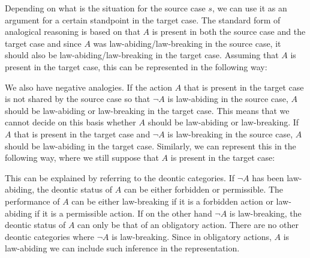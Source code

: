 		Depending on what is the situation for the source case $s$, we can use it as an argument for a certain standpoint in the target case. The standard form of analogical reasoning is based on that $A$ is present in both the source case and the target case and since $A$ was law-abiding/law-breaking in the source case, it should also be law-abiding/law-breaking in the target case. Assuming that $A$ is present in the target case, this can be represented in the following way: \medskip
			
			\noindent\begin{minipage}{0.9\textwidth}
			\end{minipage} \medskip	
			
		We also have negative analogies. If the action $A$ that is present in the target case is not shared by the source case so that $\neg A$ is law-abiding in the source case, $A$ should be law-abiding or law-breaking in the target case. This means that we cannot decide on this basis whether $A$ should be law-abiding or law-breaking. If $A$ that is present in the target case and $\neg A$ is law-breaking in the source case, $A$ should be law-abiding in the target case. Similarly, we can represent this in the following way, where we still suppose that $A$ is present in the target case:\medskip
			
			\noindent\begin{minipage}{0.9\textwidth}
			\end{minipage}\medskip

		This can be explained by referring to the deontic categories. If $\neg A$ has been law-abiding, the deontic status of $A$ can be either forbidden or permissible. The performance of $A$ can be either law-breaking if it is a forbidden action or law-abiding if it is a permissible action. If on the other hand $\neg A$ is law-breaking, the deontic status of $A$ can only be that of an obligatory action. There are no other deontic categories where $\neg A$ is law-breaking. Since in obligatory actions, $A$ is law-abiding we can include such inference in the representation. 
		
